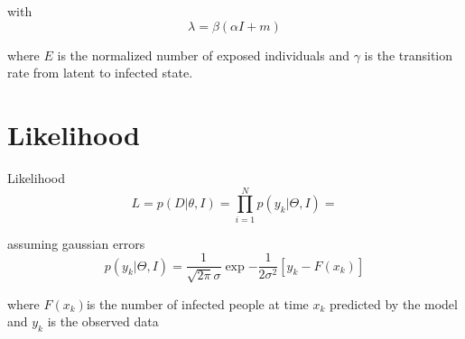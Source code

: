 \documentclass[11pt, a4paper]{article}
\begin{document}
with \[ \lambda = \beta (\alpha I + m) \]

where $E$ is the normalized number of exposed individuals and $\gamma$ is the transition rate from latent to infected state.

\section{Likelihood}
Likelihood
\begin{equation}
L =  p(D|\theta, I) = \prod_{i=1}^N p(y_k | \Theta,I) = 
\end{equation}

assuming gaussian errors
\begin{equation}
p(y_k | \Theta,I) = \frac{1}{\sqrt{2\pi}\sigma} \exp{-\frac{1}{2\sigma^2}[y_k - F(x_k)]}
\end{equation}

where $F(x_k) $is the number of infected people at time $x_k$ predicted by the model and $y_k$ is the observed data
\end{document}
